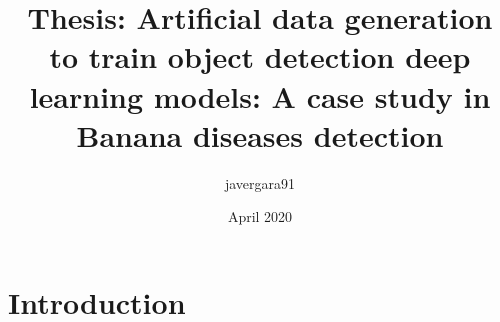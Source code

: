 \documentclass{article}
\title{Thesis: Artificial data generation to train object detection deep learning models: A case study in Banana diseases detection}
\author{javergara91 }
\date{April 2020}
\begin{document}
\maketitle

\section{Introduction}
\end{document}
